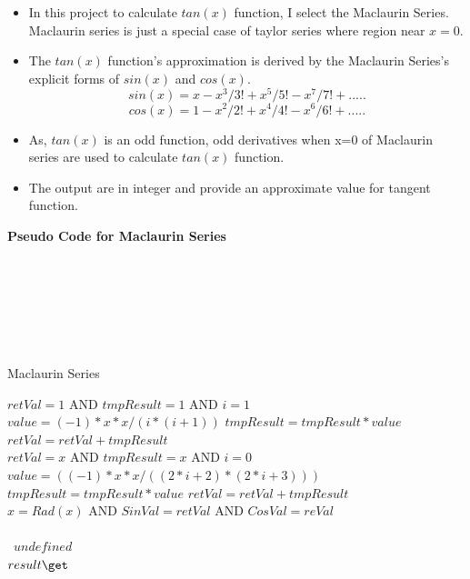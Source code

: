 \documentclass[a4paper, 11pt]{report}
\begin{document}
\begin{itemize}
\item In this project to calculate $tan(x)$ function, I select the Maclaurin Series.
Maclaurin series is just a special case of
taylor series where region near $x=0$.
\item The $tan(x)$ function's approximation is derived by the Maclaurin Series's explicit forms of $sin(x)$ and $cos(x)$.
\begin{equation} 
sin(x) = x-x^3/3!+x^5/5!-x^7/7!+.....
\end{equation}
\begin{equation} 
cos(x) = 1-x^2/2!+x^4/4!-x^6/6!+.....
\end{equation}
\item As, $tan(x)$ is an odd function, odd derivatives when x=0 of Maclaurin series are used to calculate $tan(x)$ function. \item The output are in integer and provide an approximate value for tangent function.
\end{itemize}

\textbf{Pseudo Code for Maclaurin Series}
\\\\\\\\\\\\\
\begin{algorithm}
\caption{Maclaurin Series} \label{alg:cap}
\begin{algorithmic}
\Require $retVal = 1$ AND $tmpResult = 1$ AND $i=1$
\State $value = (-1)*x*x/(i*(i+1))$
\State $tmpResult = tmpResult * value$
    \EndIf   
    \State $retVal = retVal + tmpResult$ 
\EndFor \\
\EndFunction
\Require $retVal = x$ AND $tmpResult = x$ AND $i=0$
\State $value = ((-1)*x*x/((2*i+2)*(2*i+3)))$
\State $tmpResult = tmpResult * value$
    \EndIf   
    \State $retVal = retVal + tmpResult$ 
\EndFor \\
\EndFunction
\Require $x = Rad(x)$ AND $SinVal = retVal$ AND $CosVal= reVal$
\\\ 
    \EndIf   
{}
\\\    \Return $undefined$
    \EndIf \\      
\EndFunction
\State $result \get $ 
\end{algorithmic}
\end{algorithm}
\pagebreak
\end{document}
